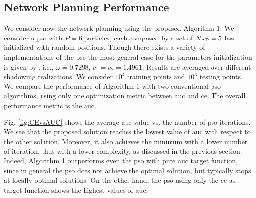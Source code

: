 \documentclass[conference]{IEEEtran}
\begin{document}
\subsection{Network Planning Performance}

We consider now the network planning using the proposed Algorithm 1. We consider a \ac{pso} with $P=6$ particles, each composed by a set of $N_{\rm AP}=5$ \acp{bs} initialized with random positions. Though there exists a variety of implementations of the \ac{pso} the most general case for the parameters initialization is given by \cite{clerc2002}, i.e.,   $\omega=0.7298$, $c_1=c_2=1.4961$. Results are averaged over different shadowing realizations. We consider $10^4$ training  points and  $10^3$ testing points. We compare the performance of Algorithm 1 with two conventional \ac{pso} algorithms, using only one optimization metric between \ac{auc} and \ac{ce}. The overall performance metric is the \ac{auc}.

Fig. \ref{fig:CEvsAUC} shows the average \ac{auc} value vs. the number of \ac{pso} iterations. We see that the proposed solution reaches the lowest value of \ac{auc} with respect to the other solution. Moreover, it also achieves the minimum with a lower number of iteration, thus with a lower complexity, as discussed in the previous section. Indeed, Algorithm 1 outperforms even the \ac{pso} with pure \ac{auc} target function, since in general the \ac{pso} does not achieve the optimal solution, but typically stops at locally optimal solutions. On the other hand, the \ac{pso} using only the \ac{ce} as target function shows the highest values of \ac{auc}. 
\end{document}
